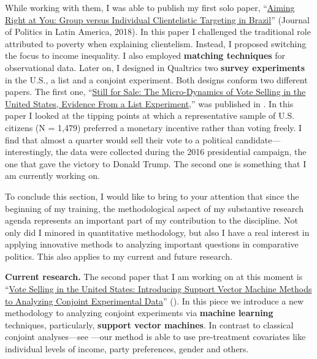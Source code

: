 \documentclass[10pt,stdletter,dateno,sigleft]{newlfm} %
\begin{document}
\begin{newlfm}
While working with them, I was able to publish my first solo paper, ``\href{https://journals.sub.uni-hamburg.de/giga/jpla/article/view/1121/1128}{Aiming Right at You: Group versus Individual Clientelistic Targeting in Brazil}'' (Journal of Politics in Latin America, 2018). In this paper I challenged the traditional role attributed to poverty when explaining clientelism. Instead, I proposed switching the focus to income inequality. I also employed {\bf matching techniques} for observational data. Later on, I designed in Qualtrics two {\bf survey experiments} in the U.S., a list and a conjoint experiment. Both designs conform two different papers. The first one, ``\href{https://github.com/hbahamonde/Vote_Selling/raw/master/Bahamonde_VoteSellingUS.pdf}{Still for Sale: The Micro-Dynamics of Vote Selling in the United States, Evidence From a List Experiment},'' was published in {\unskip}. In this paper I looked at the tipping points at which a representative sample of U.S. citizens (N = 1,479) preferred a monetary incentive rather than voting freely. I find that almost a quarter would sell their vote to a political candidate---interestingly, the data were collected during the 2016 presidential campaign, the one that gave the victory to Donald Trump. The second one is something that I am currently working on.

To conclude this section, I would like to bring to your attention that since the beginning of my training, the methodological aspect of my substantive research agenda represents an important part of my contribution to the discipline. Not only did I minored in quantitative methodology, but also I have a real interest in applying innovative methods to analyzing important questions in comparative politics. This also applies to my current and future research.


{\bf Current research.} The second paper that I am working on at this moment is ``\href{https://github.com/hbahamonde/Conjoint_US/raw/master/Bahamonde_Quininao_Conjoint_Letter_PA.pdf}{Vote Selling in the United States: Introducing Support Vector Machine Methods to Analyzing Conjoint Experimental Data}'' (\emph{\unskip}). In this piece we introduce a new methodology to analyzing conjoint experiments via {\bf machine learning} techniques, particularly, {\bf support vector machines}. In contrast to classical conjoint analyses---see \textcite{Hainmueller2014a}---our method is able to use pre-treatment covariates like individual levels of income, party preferences, gender and others. 


\end{newlfm}
\end{document}
